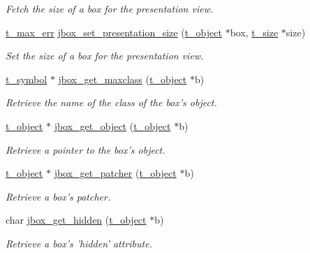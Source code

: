 \begin{DoxyCompactItemize}
\begin{DoxyCompactList}\small\item\em Fetch the size of a box for the presentation view. \item\end{DoxyCompactList}\item 
\hyperlink{group__datatypes_ga73edaae82b318855cc09fac994918165}{t\_\-max\_\-err} \hyperlink{group__jbox_ga6765c83aed47db064a1cf0581474f5c0}{jbox\_\-set\_\-presentation\_\-size} (\hyperlink{structt__object}{t\_\-object} $\ast$box, \hyperlink{structt__size}{t\_\-size} $\ast$size)
\begin{DoxyCompactList}\small\item\em Set the size of a box for the presentation view. \item\end{DoxyCompactList}\item 
\hyperlink{structt__symbol}{t\_\-symbol} $\ast$ \hyperlink{group__jbox_ga0c96d89b3e16930d8c84e4a39b21b639}{jbox\_\-get\_\-maxclass} (\hyperlink{structt__object}{t\_\-object} $\ast$b)
\begin{DoxyCompactList}\small\item\em Retrieve the name of the class of the box's object. \item\end{DoxyCompactList}\item 
\hyperlink{structt__object}{t\_\-object} $\ast$ \hyperlink{group__jbox_ga5063d165cfca9dc76162ff5757ea4852}{jbox\_\-get\_\-object} (\hyperlink{structt__object}{t\_\-object} $\ast$b)
\begin{DoxyCompactList}\small\item\em Retrieve a pointer to the box's object. \item\end{DoxyCompactList}\item 
\hyperlink{structt__object}{t\_\-object} $\ast$ \hyperlink{group__jbox_ga628997df216439d23dac3f76cd525806}{jbox\_\-get\_\-patcher} (\hyperlink{structt__object}{t\_\-object} $\ast$b)
\begin{DoxyCompactList}\small\item\em Retrieve a box's patcher. \item\end{DoxyCompactList}\item 
char \hyperlink{group__jbox_gabf4d15efce29810349772db62c3b1341}{jbox\_\-get\_\-hidden} (\hyperlink{structt__object}{t\_\-object} $\ast$b)
\begin{DoxyCompactList}\small\item\em Retrieve a box's 'hidden' attribute. \item\end{DoxyCompactList}\item 

\end{DoxyCompactItemize}
